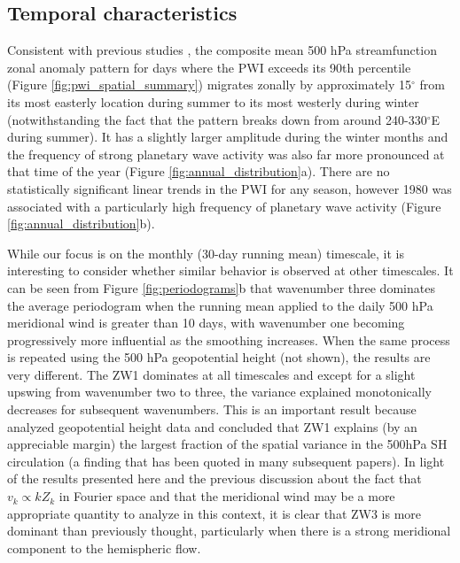 \subsection{Temporal characteristics}

Consistent with previous studies \citep[e.g.][]{vanLoon1984,Mo1985}, the composite mean 500 hPa streamfunction zonal anomaly pattern for days where the PWI exceeds its 90th percentile (Figure \ref{fig:pwi_spatial_summary}) migrates zonally by approximately 15$^{\circ}$ from its most easterly location during summer to its most westerly during winter (notwithstanding the fact that the pattern breaks down from around 240-330$^{\circ}$E during summer). It has a slightly larger amplitude during the winter months and the frequency of strong planetary wave activity was also far more pronounced at that time of the year (Figure \ref{fig:annual_distribution}a). There are no statistically significant linear trends in the PWI for any season, however 1980 was associated with a particularly high frequency of planetary wave activity (Figure \ref{fig:annual_distribution}b).

While our focus is on the monthly (30-day running mean) timescale, it is interesting to consider whether similar behavior is observed at other timescales. It can be seen from Figure \ref{fig:periodograms}b that wavenumber three dominates the average periodogram when the running mean applied to the daily 500 hPa meridional wind is greater than 10 days, with wavenumber one becoming progressively more influential as the smoothing increases. When the same process is repeated using the 500 hPa geopotential height (not shown), the results are very different. The ZW1 dominates at all timescales and except for a slight upswing from wavenumber two to three, the variance explained monotonically decreases for subsequent wavenumbers. This is an important result because \citet{vanLoon1972} analyzed geopotential height data and concluded that ZW1 explains (by an appreciable margin) the largest fraction of the spatial variance in the 500hPa SH circulation (a finding that has been quoted in many subsequent papers). In light of the results presented here and the previous discussion about the fact that $v_k \propto k Z_k$ in Fourier space and that the meridional wind may be a more appropriate quantity to analyze in this context, it is clear that ZW3 is more dominant than previously thought, particularly when there is a strong meridional component to the hemispheric flow. 
